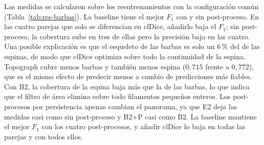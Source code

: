 Las medidas se calcularon sobre los reentrenamientos con la
configuración común (Tabla~\ref{tab:res-barbas}). La baseline tiene el
mejor $F_1$ con y sin post-proceso. En las cuatro parejas que solo se
diferencian en clDice, añadirlo baja el $F_1$; sin post-proceso, la
cobertura sube en tres de ellas pero la precisión baja en las cuatro.
Una posible explicación es que el esqueleto de las barbas es solo un
6\,\% del de las espinas, de modo que clDice optimiza sobre todo la
continuidad de la espina. Topograph cubre menos barbas y también menos
espina ($0{,}715$ frente a $0{,}772$), que es el mismo efecto de predecir
menos a cambio de predicciones más fiables. Con B2, la cobertura de la
espina baja más que la de las barbas, lo que indica que el filtro de
área elimina sobre todo filamentos pequeños enteros. Los post-procesos
por persistencia apenas cambian el panorama, ya que E2 deja las medidas
casi como sin post-proceso y B2+P casi como B2. La baseline mantiene el
mejor $F_1$ con los cuatro post-procesos, y añadir clDice lo baja en
todas las parejas y con todos ellos.

